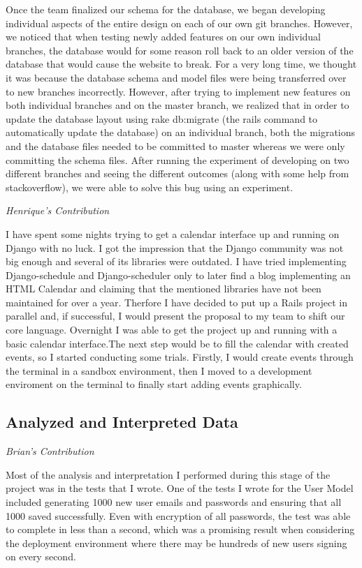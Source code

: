 \documentclass[11pt]{article}
\begin{document}
Once the team finalized our schema for the database, we began developing individual aspects of the entire design on each of our own git branches.  However, we noticed that when testing newly added features on our own individual branches, the database would for some reason roll back to an older version of the database that would cause the website to break.  For a very long time, we thought it was because the database schema and model files were being transferred over to new branches incorrectly.  However, after trying to implement new features on both individual branches and on the master branch, we realized that in order to update the database layout using rake db:migrate (the rails command to automatically update the database) on an individual branch, both the migrations and the database files needed to be committed to master whereas we were only committing the schema files.  After running the experiment of developing on two different branches and seeing the different outcomes (along with some help from stackoverflow), we were able to solve this bug using an experiment.

\textit{Henrique's Contribution}

I have spent some nights trying to get a calendar interface up and running on Django with no luck. I got the impression that the Django community was not big enough and several of its libraries were outdated. I have tried implementing Django-schedule and Django-scheduler only to later find a blog implementing an HTML Calendar and claiming that the mentioned libraries have not been maintained for over a year. Therfore I have decided to put up a Rails project in parallel and, if successful, I would present the proposal to my team to shift our core language. Overnight I was able to get the project up and running with a basic calendar interface.The next step would be to fill the calendar with created events, so I started conducting some trials. Firstly, I would create events through the terminal in a sandbox environment, then I moved to a development enviroment on the terminal to finally start adding events graphically.

\subsection{Analyzed and Interpreted Data}

\textit{Brian's Contribution}

Most of the analysis and interpretation I performed during this stage of the project was in the tests that I wrote. One of the tests I wrote for the User Model included generating 1000 new user emails and passwords and ensuring that all 1000 saved successfully. Even with encryption of all passwords, the test was able to complete in less than a second, which was a promising result when considering the deployment environment where there may be hundreds of new users signing on every second. 
\end{document}
